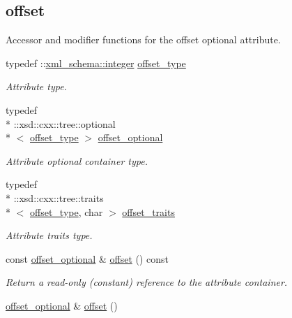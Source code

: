 \subsection*{offset}
\label{_amgrp7a86c157ee9713c34fbd7a1ee40f0c5a}%
Accessor and modifier functions for the offset optional attribute. \begin{DoxyCompactItemize}
\item 
typedef \-::\hyperlink{namespacexml__schema_aaaea7c8ce4dfbe26cc52c91c29c97b7c}{xml\-\_\-schema\-::integer} \hyperlink{classDataArray__t_a7b840c5f08bd2c65cd3c5e24ad132cfb}{offset\-\_\-type}
\begin{DoxyCompactList}\small\item\em Attribute type. \end{DoxyCompactList}\item 
typedef \\*
\-::xsd\-::cxx\-::tree\-::optional\\*
$<$ \hyperlink{classDataArray__t_a7b840c5f08bd2c65cd3c5e24ad132cfb}{offset\-\_\-type} $>$ \hyperlink{classDataArray__t_a4bc33060e7c386b658c752347ac5f03e}{offset\-\_\-optional}
\begin{DoxyCompactList}\small\item\em Attribute optional container type. \end{DoxyCompactList}\item 
typedef \\*
\-::xsd\-::cxx\-::tree\-::traits\\*
$<$ \hyperlink{classDataArray__t_a7b840c5f08bd2c65cd3c5e24ad132cfb}{offset\-\_\-type}, char $>$ \hyperlink{classDataArray__t_a2e3e1a5de665fc64a3d86fd94bb1af0f}{offset\-\_\-traits}
\begin{DoxyCompactList}\small\item\em Attribute traits type. \end{DoxyCompactList}\item 
const \hyperlink{classDataArray__t_a4bc33060e7c386b658c752347ac5f03e}{offset\-\_\-optional} \& \hyperlink{classDataArray__t_a995d24c5c7a88929a6b0e7de154bbdf5}{offset} () const 
\begin{DoxyCompactList}\small\item\em Return a read-\/only (constant) reference to the attribute container. \end{DoxyCompactList}\item 
\hyperlink{classDataArray__t_a4bc33060e7c386b658c752347ac5f03e}{offset\-\_\-optional} \& \hyperlink{classDataArray__t_aed72cbf5f3476360f4898f487a074c26}{offset} ()

\end{DoxyCompactItemize}
